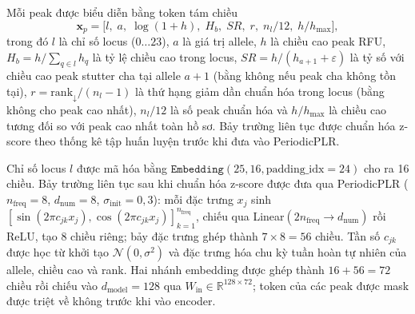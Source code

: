 \documentclass[12pt,a4paper]{article}
\begin{document}
Mỗi peak được biểu diễn bằng token tám chiều
\begin{equation}
\bm{x}_p = \bigl[l,\;a,\;\log(1+h),\;H_b,\;SR,\;r,\;n_l/12,\;h/h_{\max}\bigr],
\end{equation}
trong đó $l$ là chỉ số locus ($0\ldots23$), $a$ là giá trị allele, $h$ là chiều cao peak RFU, $H_b=h/\sum_{q\in l}h_q$ là tỷ lệ chiều cao trong locus, $SR=h/(h_{a+1}+\varepsilon)$ là tỷ số với chiều cao peak stutter cha tại allele $a+1$ (bằng không nếu peak cha không tồn tại), $r=\mathrm{rank}_{\downarrow}/(n_l-1)$ là thứ hạng giảm dần chuẩn hóa trong locus (bằng không cho peak cao nhất), $n_l/12$ là số peak chuẩn hóa và $h/h_{\max}$ là chiều cao tương đối so với peak cao nhất toàn hồ sơ. Bảy trường liên tục được chuẩn hóa z-score theo thống kê tập huấn luyện trước khi đưa vào PeriodicPLR.

Chỉ số locus $l$ được mã hóa bằng $\texttt{Embedding}(25,16,\text{padding\_idx}=24)$ cho ra 16 chiều. Bảy trường liên tục sau khi chuẩn hóa z-score được đưa qua PeriodicPLR ($n_{\mathrm{freq}}=8$, $d_{\mathrm{num}}=8$, $\sigma_{\mathrm{init}}=0{,}3$): mỗi đặc trưng $x_j$ sinh $[\sin(2\pi c_{jk}x_j), \cos(2\pi c_{jk}x_j)]_{k=1}^{n_{\mathrm{freq}}}$, chiếu qua Linear$(2n_{\mathrm{freq}}\to d_{\mathrm{num}})$ rồi ReLU, tạo 8 chiều riêng; bảy đặc trưng ghép thành $7\times8=56$ chiều. Tần số $c_{jk}$ được học từ khởi tạo $\mathcal{N}(0,\sigma^2)$ và đặc trưng hóa chu kỳ tuần hoàn tự nhiên của allele, chiều cao và rank. Hai nhánh embedding được ghép thành $16+56=72$ chiều rồi chiếu vào $d_{\mathrm{model}}=128$ qua $W_{\mathrm{in}}\in\mathbb{R}^{128\times72}$; token của các peak được mask được triệt về không trước khi vào encoder.
\end{document}
